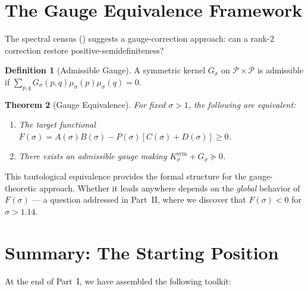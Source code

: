 \documentclass[12pt,a4paper]{article}
\newtheorem{theorem}{Theorem}[section]
\theoremstyle{definition}
\newtheorem{definition}[theorem]{Definition}
\theoremstyle{remark}
\newcommand{\Ksym}{K_\sigma^{\mathrm{sym}}}
\newcommand{\muG}{\mu_\sigma}
\newcommand{\PP}{\mathcal{P}}
\begin{document}
\section{The Gauge Equivalence Framework}
\label{sec:gauge}

The spectral census () suggests a gauge-correction approach: can a rank-2 correction restore positive-semidefiniteness?

\begin{definition}[Admissible Gauge]
A symmetric kernel $G_\sigma$ on $\PP \times \PP$ is admissible if $\sum_{p,q}G_\sigma(p,q)\muG(p)\muG(q) = 0$.
\end{definition}

\begin{theorem}[Gauge Equivalence]
\label{thm:gauge}
For fixed $\sigma > 1$, the following are equivalent:
\begin{enumerate}[label=(\roman*)]
  \item The target functional $F(\sigma) = A(\sigma)B(\sigma) - P(\sigma)[C(\sigma)+D(\sigma)] \geq 0$.
  \item There exists an admissible gauge making $\Ksym + G_\sigma \succeq 0$.
\end{enumerate}
\end{theorem}

This tautological equivalence provides the formal structure for the gauge-theoretic approach. Whether it leads anywhere depends on the \emph{global} behavior of $F(\sigma)$ --- a question addressed in Part~II, where we discover that $F(\sigma) < 0$ for $\sigma > 1.14$.


\section{Summary: The Starting Position}
\label{sec:summary}

At the end of Part~I, we have assembled the following toolkit:
\end{document}
